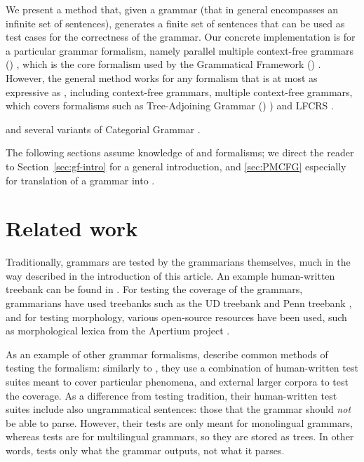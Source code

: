We present a method that, given a grammar (that in general encompasses
an infinite set of sentences), generates a finite set of sentences
that can be used as test cases for the correctness of the grammar. Our
concrete implementation is for a particular grammar formalism, namely
parallel multiple context-free grammars (\pmcfg) \cite{seki91pmcfg},
which is the core formalism used by the Grammatical Framework (\gf)
\cite{ranta2004gf}. However, the general method works for any
formalism that is at most as expressive as \pmcfg{}, including
context-free grammars, multiple context-free grammars, which covers
formalisms such as Tree-Adjoining Grammar (\tagGrammar)
\cite{joshi1975tag}) and LFCRS .

and several variants of Categorial Grammar \cite{deGroote2004,steedman1988ccg}.

The following sections assume knowledge of \gf{} and \pmcfg{}
formalisms; we direct the reader to Section~\ref{sec:gf-intro} for a
general \gf{} introduction, and \ref{sec:PMCFG} especially for
translation of a \gf{} grammar into \pmcfg{}.


\section{Related work}

Traditionally, \gf{} grammars are tested by the grammarians
themselves, much in the way described in the introduction of this
article. An example human-written treebank can be found in
\citet[p.~136--142]{khegai2006phd}.  For testing the coverage of the
grammars, grammarians have used treebanks such as the UD treebank
\cite{nivre2016ud} and Penn treebank \cite{marcus1993penntreebank},
and for testing morphology, various open-source resources have been
used, such as morphological lexica from the Apertium project
\cite{forcada2011apertium}.

As an example of other grammar formalisms,
\citet[pp.~212--213]{butt1999lfg} describe common methods of testing
the \lfg{} formalism: similarly to \gf, they use a combination of
human-written test suites meant to cover particular phenomena, and
external larger corpora to test the coverage. As a difference from
\gf{} testing tradition, their human-written test suites include also
ungrammatical sentences: those that the grammar should \emph{not} be
able to parse. However, their tests are only meant for monolingual
grammars, whereas \gf{} tests are for multilingual grammars, so they
are stored as trees. In other words, \gf{} tests only what the grammar
outputs, not what it parses.

